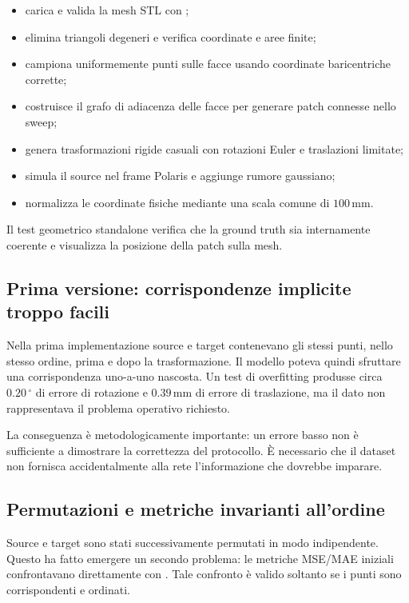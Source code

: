 \documentclass[11pt,a4paper]{article}
\newcommand{\code}[1]{\texttt{\detokenize{#1}}}
\newcommand{\SI}[2]{\ensuremath{#1\,#2}}
\newcommand{\milli}{\mathrm{m}}
\newcommand{\metre}{\mathrm{m}}
\newcommand{\degree}{^\circ}
\begin{document}
\begin{itemize}
    \item carica e valida la mesh STL con \code{trimesh};
    \item elimina triangoli degeneri e verifica coordinate e aree finite;
    \item campiona uniformemente punti sulle facce usando coordinate
    baricentriche corrette;
    \item costruisce il grafo di adiacenza delle facce per generare patch
    connesse nello sweep;
    \item genera trasformazioni rigide casuali con rotazioni Euler e
    traslazioni limitate;
    \item simula il source nel frame Polaris e aggiunge rumore gaussiano;
    \item normalizza le coordinate fisiche mediante una scala comune di
    \SI{100}{\milli\metre}.
\end{itemize}

Il test geometrico standalone verifica che la ground truth sia internamente
coerente e visualizza la posizione della patch sulla mesh.

\subsection{Prima versione: corrispondenze implicite troppo facili}

Nella prima implementazione source e target contenevano gli stessi punti, nello
stesso ordine, prima e dopo la trasformazione. Il modello poteva quindi
sfruttare una corrispondenza uno-a-uno nascosta. Un test di overfitting produsse
circa \SI{0.20}{\degree} di errore di rotazione e
\SI{0.39}{\milli\metre} di errore di traslazione, ma il dato non rappresentava
il problema operativo richiesto.

La conseguenza è metodologicamente importante: un errore basso non è
sufficiente a dimostrare la correttezza del protocollo. È necessario che il
dataset non fornisca accidentalmente alla rete l'informazione che dovrebbe
imparare.

\subsection{Permutazioni e metriche invarianti all'ordine}

Source e target sono stati successivamente permutati in modo indipendente.
Questo ha fatto emergere un secondo problema: le metriche MSE/MAE iniziali
confrontavano direttamente
\code{transformed_src} con \code{target}. Tale confronto è valido soltanto se
i punti sono corrispondenti e ordinati.
\end{document}

